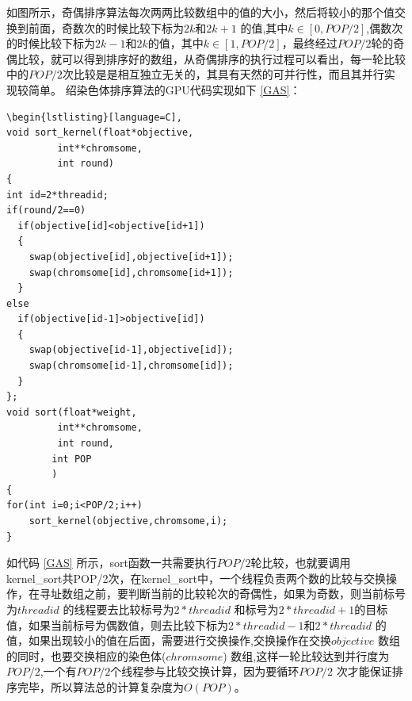 如图所示，奇偶排序算法每次两两比较数组中的值的大小，然后将较小的那个值交换到前面，奇数次的时候比较下标为$2k 和2k+1$ 的值,其中$k \in [0,POP/2]$,偶数次的时候比较下标为$2k-1和2k$的值，其中$k \in[1,POP/2]$，最终经过$POP/2$轮的奇偶比较，就可以得到排序好的数组，从奇偶排序的执行过程可以看出，每一轮比较中的$POP/2$次比较是是相互独立无关的，其具有天然的可并行性，而且其并行实现较简单。
绍染色体排序算法的GPU代码实现如下 \ref{GAS}：
\begin{lstlisting}[caption={并行排序算法},captionpos=b,firstnumber=1,label={GAS}]
\begin{lstlisting}[language=C],
void sort_kernel(float*objective,
	     int**chromsome,
	     int round)
{
int id=2*threadid;
if(round/2==0)
  if(objective[id]<objective[id+1])
  {
	swap(objective[id],objective[id+1]);
	swap(chromsome[id],chromsome[id+1]);
  }
else
  if(objective[id-1]>objective[id])
  {
	swap(objective[id-1],objective[id]);
	swap(chromsome[id-1],chromsome[id]);
  }
};
void sort(float*weight,
	     int**chromsome,
	     int round,
		int POP
		)
{
for(int i=0;i<POP/2;i++)
    sort_kernel(objective,chromsome,i);
}
\end{lstlisting}

如代码 \ref{GAS} 所示，sort函数一共需要执行$POP/2$轮比较，也就要调用kernel\_sort共POP/2次，在kernel\_sort中，一个线程负责两个数的比较与交换操作，在寻址数组之前，要判断当前的比较轮次的奇偶性，如果为奇数，则当前标号为$threadid$ 的线程要去比较标号为$2*threadid$ 和标号为$2*threadid+1$的目标值，如果当前标号为偶数值，则去比较下标为$2*threadid-1$和$2*threadid$ 的值，如果出现较小的值在后面，需要进行交换操作,交换操作在交换$objective$ 数组的同时，也要交换相应的染色体($chromsome$) 数组,这样一轮比较达到并行度为$POP/2$,一个有$POP/2$个线程参与比较交换计算，因为要循环$POP/2$ 次才能保证排序完毕，所以算法总的计算复杂度为$O(POP)$。

